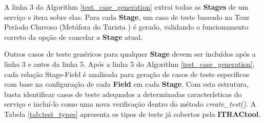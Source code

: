 A linha 3 do Algorithm \ref{test_case_generation} extrai todas as \textbf{Stages} de um serviço e itera sobre elas. Para cada \textbf{Stage}, um caso de teste baseado na Tour Período Chuvoso (Metáfora do Turista \cite{whittaker2009exploratory}) é gerado, validando o funcionamento correto da opção de cancelar a \textbf{Stage} atual.

Outros casos de teste genéricos para qualquer \textbf{Stage} devem ser incluídos após a linha 3 e antes da linha 5. Após a linha 5 do Algorithm \ref{test_case_generation}, cada relação Stage-Field é analisada para geração de casos de teste específicos com base na configuração de cada \textbf{Field} em cada \textbf{Stage}. Com esta estrutura, basta identificar casos de teste adequados a determinadas características do serviço e incluí-lo como uma nova verificação dentro do método \textit{create\_test()}. A Tabela \ref{tab:test_types} apresenta os tipos de teste já cobertos pela \textbf{ITRACtool}.


